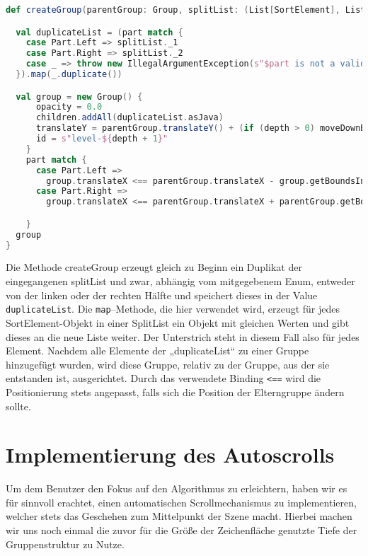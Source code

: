 \begin{lstlisting}[language=Scala,caption=Erstellung der Gruppe]
def createGroup(parentGroup: Group, splitList: (List[SortElement], List[SortElement]), part: EnumVal, depth: Int): Group = {

  val duplicateList = (part match {
    case Part.Left => splitList._1
    case Part.Right => splitList._2
    case _ => throw new IllegalArgumentException(s"$part is not a valid argument")
  }).map(_.duplicate())

  val group = new Group() {
      opacity = 0.0
      children.addAll(duplicateList.asJava)
      translateY = parentGroup.translateY() + (if (depth > 0) moveDownByPixel else 0)
      id = s"level-${depth + 1}"
    }
    part match {
      case Part.Left =>
        group.translateX <== parentGroup.translateX - group.getBoundsInParent.getWidth / 2 + SortElement.width / 2
      case Part.Right =>
        group.translateX <== parentGroup.translateX + parentGroup.getBoundsInParent.getWidth / 2 - group.getBoundsInParent.getWidth/2 - SortElement.width/2

    }
  group
}
\end{lstlisting}

Die Methode createGroup erzeugt gleich zu Beginn ein Duplikat der eingegangenen splitList und zwar, abhängig vom mitgegebenem Enum, entweder von der linken oder der rechten Hälfte und speichert dieses in der Value \texttt{duplicateList}. Die \texttt{map}--Methode, die hier verwendet wird, erzeugt für jedes SortElement-Objekt in einer SplitList ein Objekt mit gleichen Werten und gibt dieses an die neue Liste weiter. Der Unterstrich steht in diesem Fall also für jedes Element. Nachdem alle Elemente der „duplicateList“ zu einer Gruppe hinzugefügt wurden, wird diese Gruppe, relativ zu der Gruppe, aus der sie entstanden ist, ausgerichtet. Durch das verwendete Binding \texttt{<==} wird die Positionierung stets angepasst, falls sich die Position der Elterngruppe ändern sollte.

\section{Implementierung des Autoscrolls}
Um dem Benutzer den Fokus auf den Algorithmus zu erleichtern, haben wir es für sinnvoll erachtet, einen automatischen Scrollmechanismus zu implementieren, welcher stets das Geschehen zum Mittelpunkt der Szene macht. Hierbei machen wir uns noch einmal die zuvor für die Größe der Zeichenfläche genutzte Tiefe der Gruppenstruktur zu Nutze.

